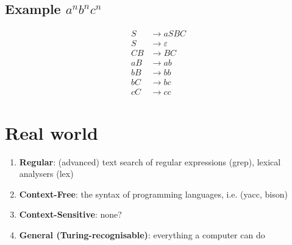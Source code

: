 \documentclass{article}[18pt]
\begin{document}
\subsection{Example $a^nb^nc^n$}
\[
\begin{aligned} S & \rightarrow a S B C \\ S & \rightarrow \varepsilon \\ C B & \rightarrow B C \\ a B & \rightarrow a b \\ b B & \rightarrow b b \\ b C & \rightarrow b c \\ c C & \rightarrow c c \end{aligned}
\]
\section{Real world}
\begin{enumerate}
	\item \textbf{Regular}: (advanced) text search of regular expressions (grep), lexical analysers (lex)
	\item \textbf{Context-Free}: the syntax of programming languages, i.e. (yacc, bison)
	\item \textbf{Context-Sensitive}: none?
	\item \textbf{General (Turing-recognisable)}: everything a computer can do
\end{enumerate}
\end{document}
